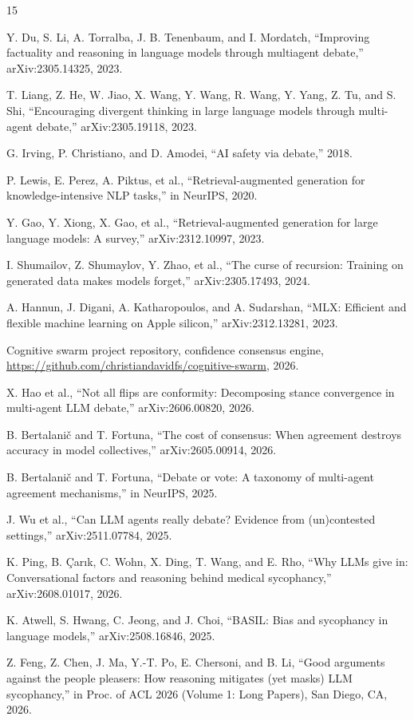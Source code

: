 \documentclass[conference,compsoc]{IEEEtran}
\begin{document}
\begin{thebibliography}{15}

Y. Du, S. Li, A. Torralba, J. B. Tenenbaum, and I. Mordatch, ``Improving factuality and reasoning in language models through multiagent debate,'' arXiv:2305.14325, 2023.

T. Liang, Z. He, W. Jiao, X. Wang, Y. Wang, R. Wang, Y. Yang, Z. Tu, and S. Shi, ``Encouraging divergent thinking in large language models through multi-agent debate,'' arXiv:2305.19118, 2023.

G. Irving, P. Christiano, and D. Amodei, ``AI safety via debate,'' 2018.

P. Lewis, E. Perez, A. Piktus, et al., ``Retrieval-augmented generation for knowledge-intensive NLP tasks,'' in NeurIPS, 2020.

Y. Gao, Y. Xiong, X. Gao, et al., ``Retrieval-augmented generation for large language models: A survey,'' arXiv:2312.10997, 2023.

I. Shumailov, Z. Shumaylov, Y. Zhao, et al., ``The curse of recursion: Training on generated data makes models forget,'' arXiv:2305.17493, 2024.

A. Hannun, J. Digani, A. Katharopoulos, and A. Sudarshan, ``MLX: Efficient and flexible machine learning on Apple silicon,'' arXiv:2312.13281, 2023.

Cognitive swarm project repository, confidence consensus engine, \url{https://github.com/christiandavidfs/cognitive-swarm}, 2026.

X. Hao et al., ``Not all flips are conformity: Decomposing stance convergence in multi-agent LLM debate,'' arXiv:2606.00820, 2026.

B. Bertalani\v{c} and T. Fortuna, ``The cost of consensus: When agreement destroys accuracy in model collectives,'' arXiv:2605.00914, 2026.

B. Bertalani\v{c} and T. Fortuna, ``Debate or vote: A taxonomy of multi-agent agreement mechanisms,'' in NeurIPS, 2025.

J. Wu et al., ``Can LLM agents really debate? Evidence from (un)contested settings,'' arXiv:2511.07784, 2025.

K. Ping, B. \c{C}ar\i{k}, C. Wohn, X. Ding, T. Wang, and E. Rho, ``Why LLMs give in: Conversational factors and reasoning behind medical sycophancy,'' arXiv:2608.01017, 2026.

K. Atwell, S. Hwang, C. Jeong, and J. Choi, ``BASIL: Bias and sycophancy in language models,'' arXiv:2508.16846, 2025.

Z. Feng, Z. Chen, J. Ma, Y.-T. Po, E. Chersoni, and B. Li, ``Good arguments against the people pleasers: How reasoning mitigates (yet masks) LLM sycophancy,'' in Proc. of ACL 2026 (Volume 1: Long Papers), San Diego, CA, 2026.

\end{thebibliography}
\end{document}
